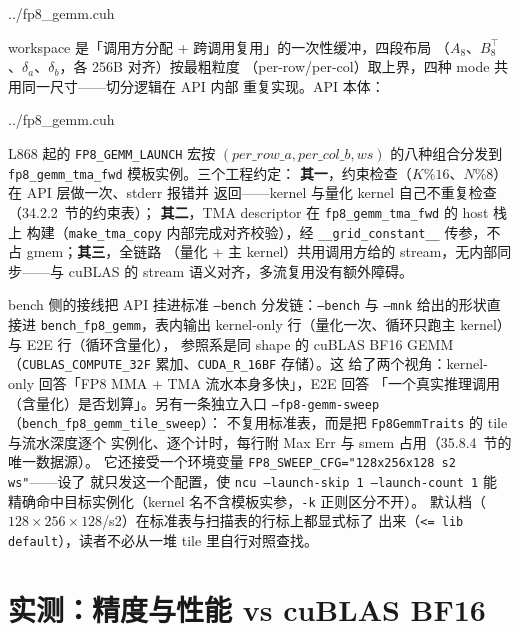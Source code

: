 \begin{lstinputlisting}[linerange={831-845},firstnumber=auto,
  title={fp8\_gemm.cuh L831-845（workspace 布局：四段 256B 对齐）}]{../fp8_gemm.cuh}
\end{lstinputlisting}

workspace 是「调用方分配 + 跨调用复用」的一次性缓冲，四段布局
（$A_8$、$B_8^{\top}$、$\delta_a$、$\delta_b$，各 256B 对齐）按最粗粒度
（per-row/per-col）取上界，四种 mode 共用同一尺寸——切分逻辑在 API 内部
重复实现。API 本体：

\begin{lstinputlisting}[linerange={847-901},firstnumber=auto,
  title={fp8\_gemm.cuh L847-901（fp8\_gemm\_bf16：约束自检 + workspace 切分 + mode 分发）}]{../fp8_gemm.cuh}
\end{lstinputlisting}

L868 起的 \texttt{FP8\_GEMM\_LAUNCH} 宏按 $(per\_row\_a, per\_col\_b, ws)$
的八种组合分发到 \texttt{fp8\_gemm\_tma\_fwd} 模板实例。三个工程约定：
\textbf{其一}，约束检查（$K\%16$、$N\%8$）在 API 层做一次、stderr 报错并
返回——kernel 与量化 kernel 自己不重复检查（34.2.2~节的约束表）；
\textbf{其二}，TMA descriptor 在 \texttt{fp8\_gemm\_tma\_fwd} 的 host 栈上
构建（\texttt{make\_tma\_copy} 内部完成对齐校验），经
\texttt{\_\_grid\_constant\_\_} 传参，不占 gmem；\textbf{其三}，全链路
（量化 + 主 kernel）共用调用方给的 stream，无内部同步——与 cuBLAS 的
stream 语义对齐，多流复用没有额外障碍。

bench 侧的接线把 API 挂进标准 \texttt{--bench} 分发链：\texttt{--bench}
与 \texttt{--mnk} 给出的形状直接进 \texttt{bench\_fp8\_gemm}，表内输出
kernel-only 行（量化一次、循环只跑主 kernel）与 E2E 行（循环含量化），
参照系是同 shape 的 cuBLAS BF16 GEMM
（\texttt{CUBLAS\_COMPUTE\_32F} 累加、\texttt{CUDA\_R\_16BF} 存储）。这
给了两个视角：kernel-only 回答「FP8 MMA + TMA 流水本身多快」，E2E 回答
「一个真实推理调用（含量化）是否划算」。另有一条独立入口
\texttt{--fp8-gemm-sweep}（\texttt{bench\_fp8\_gemm\_tile\_sweep}）：
不复用标准表，而是把 \texttt{Fp8GemmTraits} 的 tile 与流水深度逐个
实例化、逐个计时，每行附 Max Err 与 smem 占用（35.8.4~节的唯一数据源）。
它还接受一个环境变量 \texttt{FP8\_SWEEP\_CFG="128x256x128 s2 ws"}——设了
就只发这一个配置，使 \texttt{ncu --launch-skip 1 --launch-count 1} 能
精确命中目标实例化（kernel 名不含模板实参，\texttt{-k} 正则区分不开）。
默认档（$128\times256\times128$/s2）在标准表与扫描表的行标上都显式标了
出来（\texttt{<= lib default}），读者不必从一堆 tile 里自行对照查找。

\section{实测：精度与性能 vs cuBLAS BF16}\label{sec:35-perf}

